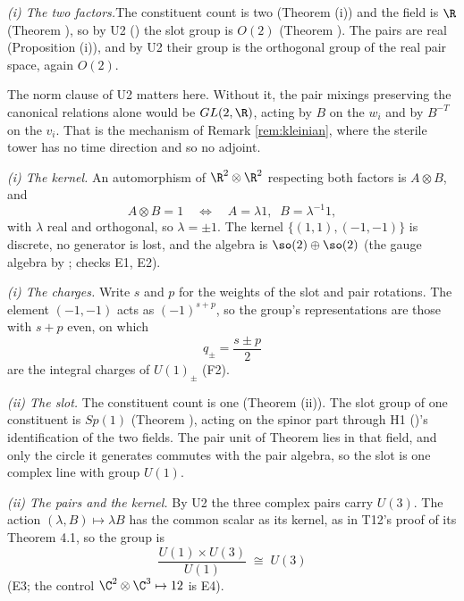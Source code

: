 \textit{(i) The two factors.}\enspace The constituent count is two (Theorem (i)) and the field is $\R$ (Theorem ), so by U2 () the slot group is $O(2)$ (Theorem ). The pairs are real (Proposition (i)), and by U2 their group is the orthogonal group of the real pair space, again $O(2)$.

The norm clause of U2 matters here. Without it, the pair mixings preserving the canonical relations alone would be $GL(2,\R)$, acting by $B$ on the $w_{i}$ and by $B^{-T}$ on the $v_{i}$. That is the mechanism of Remark \ref{rem:kleinian}, where the sterile tower has no time direction and so no adjoint.



\emph{(i) The kernel.}  An automorphism of $\R^{2} \otimes \R^{2}$ respecting both factors is $A \otimes B$, and
\[
A \otimes B = 1 \quad\Longleftrightarrow\quad A = \lambda 1, \;\; B = \lambda^{-1}1,
\]
with $\lambda$ real and orthogonal, so $\lambda = \pm 1$. The kernel $\{(1,1), (-1,-1)\}$ is discrete, no generator is lost, and the algebra is $\so(2) \oplus \so(2)$ (the gauge algebra by ; checks E1, E2).



\emph{(i) The charges.}  Write $s$ and $p$ for the weights of the slot and pair rotations. The element $(-1, -1)$ acts as $(-1)^{s + p}$, so the group's representations are those with $s + p$ even, on which
\[
q_{\pm} = \frac{s \pm p}{2}
\]
are the integral charges of $U(1)_{\pm}$ (F2).



\emph{(ii) The slot.}  The constituent count is one (Theorem (ii)). The slot group of one constituent is $Sp(1)$ (Theorem ), acting on the spinor part through H1 ()'s identification of the two fields. The pair unit of Theorem  lies in that field, and only the circle it generates commutes with the pair algebra, so the slot is one complex line with group $U(1)$.



\emph{(ii) The pairs and the kernel.}  By U2 the three complex pairs carry $U(3)$. The action $(\lambda, B) \mapsto \lambda B$ has the common scalar as its kernel, as in T12's proof of its Theorem 4.1, so the group is
\[
\frac{U(1) \times U(3)}{U(1)} \;\cong\; U(3)
\]
(E3; the control $\C^{2} \otimes \C^{3} \mapsto 12$ is E4).
